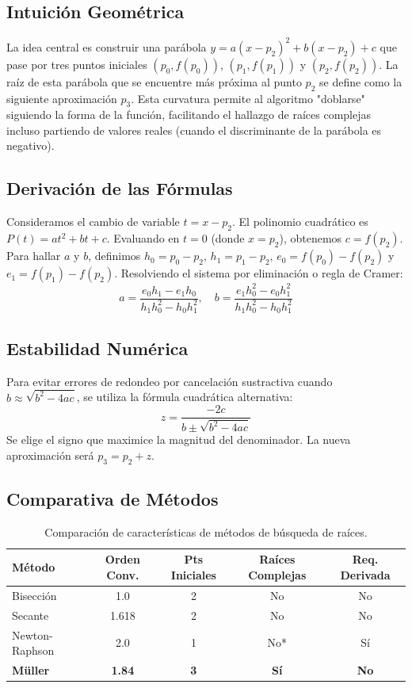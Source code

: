 \documentclass[11pt,a4paper]{article}
\begin{document}
\subsection{Intuición Geométrica}
La idea central es construir una parábola $y = a(x-p_2)^2 + b(x-p_2) + c$ que pase por tres puntos iniciales $(p_0, f(p_0))$, $(p_1, f(p_1))$ y $(p_2, f(p_2))$. La raíz de esta parábola que se encuentre más próxima al punto $p_2$ se define como la siguiente aproximación $p_3$. Esta curvatura permite al algoritmo "doblarse" siguiendo la forma de la función, facilitando el hallazgo de raíces complejas incluso partiendo de valores reales (cuando el discriminante de la parábola es negativo).

\subsection{Derivación de las Fórmulas}
Consideramos el cambio de variable $t = x - p_2$. El polinomio cuadrático es $P(t) = at^2 + bt + c$. Evaluando en $t=0$ (donde $x=p_2$), obtenemos $c = f(p_2)$. Para hallar $a$ y $b$, definimos $h_0 = p_0 - p_2$, $h_1 = p_1 - p_2$, $e_0 = f(p_0) - f(p_2)$ y $e_1 = f(p_1) - f(p_2)$. Resolviendo el sistema por eliminación o regla de Cramer:
\begin{equation}
    a = \frac{e_0 h_1 - e_1 h_0}{h_1 h_0^2 - h_0 h_1^2}, \quad b = \frac{e_1 h_0^2 - e_0 h_1^2}{h_1 h_0^2 - h_0 h_1^2}
\end{equation}

\subsection{Estabilidad Numérica}
Para evitar errores de redondeo por cancelación sustractiva cuando $b \approx \sqrt{b^2 - 4ac}$, se utiliza la fórmula cuadrática alternativa:
\begin{equation}
    z = \frac{-2c}{b \pm \sqrt{b^2 - 4ac}}
\end{equation}
Se elige el signo que maximice la magnitud del denominador. La nueva aproximación será $p_3 = p_2 + z$.

\subsection{Comparativa de Métodos}
\begin{table}[h]
\begin{center}
\begin{tabular}{lcccc}
\toprule
\textbf{Método} & \textbf{Orden Conv.} & \textbf{Pts Iniciales} & \textbf{Raíces Complejas} & \textbf{Req. Derivada} \\
\midrule
Bisección & 1.0 & 2 & No & No \\
Secante & 1.618 & 2 & No & No \\
Newton-Raphson & 2.0 & 1 & No* & Sí \\
\textbf{Müller} & \textbf{1.84} & \textbf{3} & \textbf{Sí} & \textbf{No} \\
\bottomrule
\end{tabular}
\caption{Comparación de características de métodos de búsqueda de raíces.}
\end{center}
\end{table}
\end{document}
